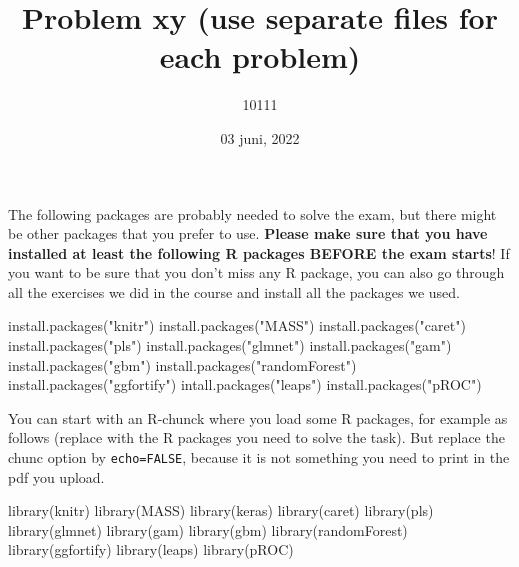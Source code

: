 \documentclass[
]{article}
\title{Problem xy (use separate files for each problem)}
\author{10111}
\date{03 juni, 2022}
\newenvironment{Shaded}{\begin{snugshade}}{\end{snugshade}}
\newcommand{\FunctionTok}[1]{\textcolor[rgb]{0.00,0.00,0.00}{#1}}
\newcommand{\NormalTok}[1]{#1}
\newcommand{\StringTok}[1]{\textcolor[rgb]{0.31,0.60,0.02}{#1}}
\begin{document}
\maketitle

The following packages are probably needed to solve the exam, but there
might be other packages that you prefer to use. \textbf{Please make sure
that you have installed at least the following R packages BEFORE the
exam starts}! If you want to be sure that you don't miss any R package,
you can also go through all the exercises we did in the course and
install all the packages we used.

\begin{Shaded}
\begin{Highlighting}[]
\FunctionTok{install.packages}\NormalTok{(}\StringTok{"knitr"}\NormalTok{)}
\FunctionTok{install.packages}\NormalTok{(}\StringTok{"MASS"}\NormalTok{)}
\FunctionTok{install.packages}\NormalTok{(}\StringTok{"caret"}\NormalTok{)}
\FunctionTok{install.packages}\NormalTok{(}\StringTok{"pls"}\NormalTok{)}
\FunctionTok{install.packages}\NormalTok{(}\StringTok{"glmnet"}\NormalTok{)}
\FunctionTok{install.packages}\NormalTok{(}\StringTok{"gam"}\NormalTok{)}
\FunctionTok{install.packages}\NormalTok{(}\StringTok{"gbm"}\NormalTok{)}
\FunctionTok{install.packages}\NormalTok{(}\StringTok{"randomForest"}\NormalTok{)}
\FunctionTok{install.packages}\NormalTok{(}\StringTok{"ggfortify"}\NormalTok{)}
\FunctionTok{intall.packages}\NormalTok{(}\StringTok{"leaps"}\NormalTok{)}
\FunctionTok{install.packages}\NormalTok{(}\StringTok{"pROC"}\NormalTok{)}
\end{Highlighting}
\end{Shaded}

You can start with an R-chunck where you load some R packages, for
example as follows (replace with the R packages you need to solve the
task). But replace the chunc option by \texttt{echo=FALSE}, because it
is not something you need to print in the pdf you upload.

\begin{Shaded}
\begin{Highlighting}[]
\FunctionTok{library}\NormalTok{(knitr)}
\FunctionTok{library}\NormalTok{(MASS)}
\FunctionTok{library}\NormalTok{(keras)}
\FunctionTok{library}\NormalTok{(caret)}
\FunctionTok{library}\NormalTok{(pls)}
\FunctionTok{library}\NormalTok{(glmnet)}
\FunctionTok{library}\NormalTok{(gam)}
\FunctionTok{library}\NormalTok{(gbm)}
\FunctionTok{library}\NormalTok{(randomForest)}
\FunctionTok{library}\NormalTok{(ggfortify)}
\FunctionTok{library}\NormalTok{(leaps)}
\FunctionTok{library}\NormalTok{(pROC)}
\end{Highlighting}
\end{Shaded}
\end{document}
